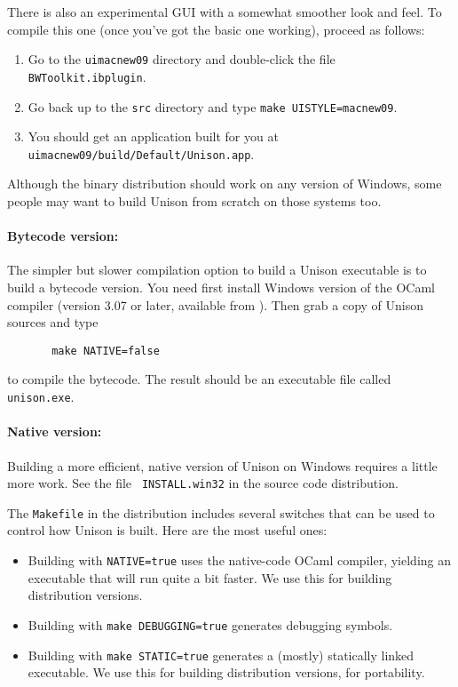 \documentclass{article}
\begin{document}
There is also an experimental GUI with a somewhat smoother look and feel.
To compile this one (once you've got the basic one working), proceed as
follows:
\begin{enumerate}
\item Go to the {\tt uimacnew09} directory and double-click the file {\tt
  BWToolkit.ibplugin}.
\item Go back up to the {\tt src} directory and type {\tt make
  UISTYLE=macnew09}.  
\item You should get an application built for you at {\tt
  uimacnew09/build/Default/Unison.app}.
\end{enumerate}



Although the binary distribution should work on any version of Windows,
some people may want to build Unison from scratch on those systems too.

\paragraph{Bytecode version:} The simpler but slower compilation option
to build a Unison executable is to build a bytecode version.  You need
first install Windows version of the OCaml compiler (version 3.07 or
later, available from ).  Then grab a copy
of Unison sources and type  
\begin{verbatim}
       make NATIVE=false
\end{verbatim}
to compile the bytecode.  The result should be an executable file called
\verb|unison.exe|. 

\paragraph{Native version:} Building a more efficient, native version of
Unison on Windows requires a little more work.  See the file {\tt
  INSTALL.win32} in the source code distribution.



The \verb|Makefile| in the distribution includes several switches that
can be used to control how Unison is built.  Here are the most useful
ones:
\begin{itemize}
\item Building with \verb|NATIVE=true| uses the native-code OCaml
compiler, yielding an executable that will run quite a bit faster. We use
this for building distribution versions.
\item Building with \verb|make DEBUGGING=true| generates debugging
symbols. 
\item Building with \verb|make STATIC=true| generates a (mostly)
statically linked executable.  We use this for building distribution
versions, for portability.
\end{itemize}
\end{document}
